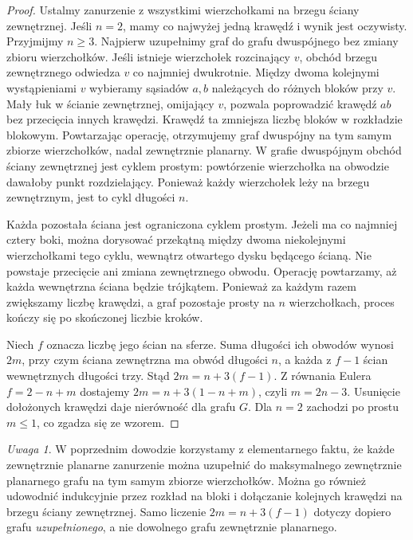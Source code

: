 \documentclass[11pt,a4paper]{report}
\numberwithin{equation}{section}
\theoremstyle{plain}
\theoremstyle{definition}
\theoremstyle{remark}
\newtheorem{uwaga}[twierdzenie]{Uwaga}
\begin{document}
\begin{proof}
Ustalmy zanurzenie z wszystkimi wierzchołkami na brzegu
ściany zewnętrznej. Jeśli $n=2$, mamy co najwyżej jedną
krawędź i wynik jest oczywisty. Przyjmijmy $n\ge3$.
Najpierw uzupełnimy graf do grafu dwuspójnego bez zmiany
zbioru wierzchołków. Jeśli istnieje wierzchołek rozcinający
$v$, obchód brzegu zewnętrznego odwiedza $v$ co najmniej
dwukrotnie. Między dwoma kolejnymi wystąpieniami $v$
wybieramy sąsiadów $a,b$ należących do różnych bloków
przy $v$. Mały łuk w ścianie zewnętrznej, omijający $v$,
pozwala poprowadzić krawędź $ab$ bez przecięcia innych
krawędzi. Krawędź ta zmniejsza liczbę bloków w rozkładzie
blokowym. Powtarzając operację, otrzymujemy graf dwuspójny
na tym samym zbiorze wierzchołków, nadal zewnętrznie planarny.
W grafie dwuspójnym obchód ściany zewnętrznej jest cyklem
prostym: powtórzenie wierzchołka na obwodzie dawałoby punkt
rozdzielający. Ponieważ każdy wierzchołek leży na brzegu
zewnętrznym, jest to cykl długości $n$.

Każda pozostała ściana jest ograniczona cyklem prostym.
Jeżeli ma co najmniej cztery boki, można dorysować przekątną
między dwoma niekolejnymi wierzchołkami tego cyklu,
wewnątrz otwartego dysku będącego ścianą. Nie powstaje
przecięcie ani zmiana zewnętrznego obwodu. Operację
powtarzamy, aż każda wewnętrzna ściana będzie trójkątem.
Ponieważ za każdym razem zwiększamy liczbę krawędzi,
a graf pozostaje prosty na $n$ wierzchołkach, proces
kończy się po skończonej liczbie kroków.

Niech $f$ oznacza liczbę jego ścian na sferze.
Suma długości ich obwodów wynosi $2m$, przy czym
ściana zewnętrzna ma obwód długości $n$,
a każda z $f-1$ ścian wewnętrznych długości trzy.
Stąd $2m=n+3(f-1)$.
Z równania Eulera $f=2-n+m$ dostajemy
$2m=n+3(1-n+m)$, czyli $m=2n-3$.
Usunięcie dołożonych krawędzi daje nierówność dla grafu $G$.
Dla $n=2$ zachodzi po prostu $m\le1$, co zgadza się ze wzorem.
\end{proof}

\begin{uwaga}
W poprzednim dowodzie korzystamy z elementarnego faktu,
że każde zewnętrznie planarne zanurzenie można uzupełnić
do maksymalnego zewnętrznie planarnego grafu na tym samym
zbiorze wierzchołków. Można go również udowodnić
indukcyjnie przez rozkład na bloki i dołączanie kolejnych
krawędzi na brzegu ściany zewnętrznej. Samo liczenie
$2m=n+3(f-1)$ dotyczy dopiero grafu \emph{uzupełnionego},
a nie dowolnego grafu zewnętrznie planarnego.
\end{uwaga}
\end{document}
